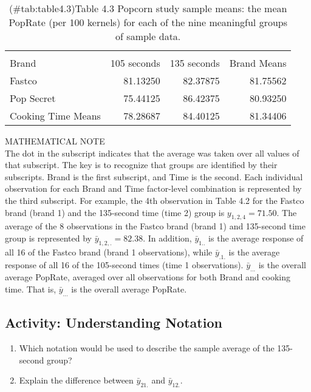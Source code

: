 \documentclass[
]{report}
\providecommand{\tightlist}{%
  \setlength{\itemsep}{0pt}\setlength{\parskip}{0pt}}
\begin{document}
\begin{table}

\caption{(\#tab:table4.3)Table 4.3 Popcorn study sample means: the mean PopRate (per 100 kernels) for each of the nine meaningful groups of sample data.}
\centering
\begin{tabular}[t]{lrrr}
\toprule
{} &  &  \\
\cmidrule(l{3pt}r{3pt}){2-3}
Brand & 105 seconds & 135 seconds & Brand Means\\
\midrule
Fastco & 81.13250 & 82.37875 & 81.75562\\
Pop Secret & 75.44125 & 86.42375 & 80.93250\\
Cooking Time Means & 78.28687 & 84.40125 & 81.34406\\
\bottomrule
\end{tabular}
\end{table}

MATHEMATICAL NOTE\\
The dot in the subscript indicates that the average was taken over all values of that subscript. The key is to recognize that groups are identified by their subscripts. Brand is the first subscript, and Time is the second. Each individual observation for each Brand and Time factor-level combination is represented by the third subscript. For example, the 4th observation in Table 4.2 for the Fastco brand (brand 1) and the 135-second time (time 2) group is \(y_{1,2,4} = 71.50\). The average of the 8 observations in the Fastco brand (brand 1) and 135-second time group is represented by \(\bar y_{1,2,.} = 82.38\). In addition, \(\bar y_{1..}\) is the average response of all 16 of the Fastco brand (brand 1 observations), while \(\bar y_{.1.}\) is the average response of all 16 of the 105-second times (time 1 observations). \(\bar y_{...}\) is the overall average PopRate, averaged over all observations for both Brand and cooking time. That is, \(\bar y_{...}\) is the overall average PopRate.

\subsection{Activity: Understanding Notation}\label{activity-understanding-notation}

\begin{enumerate}
\def\labelenumi{\arabic{enumi}.}
\setcounter{enumi}{5}
\tightlist
\item
  Which notation would be used to describe the sample average of the 135-second group?
\item
  Explain the difference between \(\bar y_{21.}\) and \(\bar y_{12.}\).
\end{enumerate}
\end{document}
